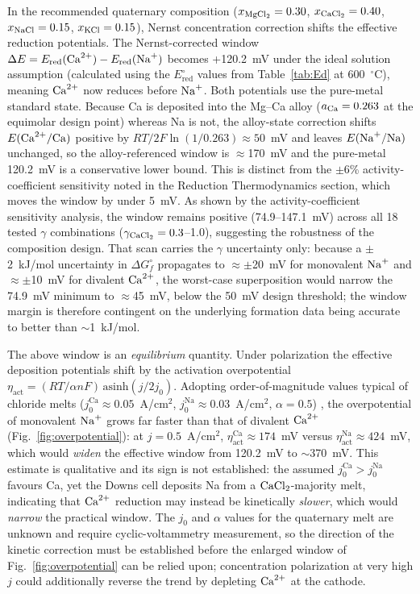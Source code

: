 \documentclass[pdflatex,sn-basic,Numbered]{sn-jnl}
\begin{document}
In the recommended quaternary composition ($x_{\ce{MgCl2}}=0.30$, $x_{\ce{CaCl2}}=0.40$, $x_{\ce{NaCl}}=0.15$, $x_{\ce{KCl}}=0.15$), Nernst concentration correction shifts the effective reduction potentials. The Nernst-corrected window $\Delta E = E_{\mathrm{red}}(\ce{Ca^{2+}}) - E_{\mathrm{red}}(\ce{Na+})$ becomes +120.2~mV under the ideal solution assumption (calculated using the $E^{\circ}_{\mathrm{red}}$ values from Table~\ref{tab:Ed} at 600~$^{\circ}$C), meaning $\ce{Ca^{2+}}$ now reduces before $\ce{Na+}$. Both potentials use the pure-metal standard state. Because Ca is deposited into the Mg--Ca alloy ($a_{\ce{Ca}} = 0.263$ at the equimolar design point) whereas Na is not, the alloy-state correction shifts $E(\ce{Ca^{2+}}/\ce{Ca})$ positive by $RT/2F\ln(1/0.263) \approx 50$~mV and leaves $E(\ce{Na+}/\ce{Na})$ unchanged, so the alloy-referenced window is $\approx$170~mV and the pure-metal 120.2~mV is a conservative lower bound. This is distinct from the $\pm$6\% activity-coefficient sensitivity noted in the Reduction Thermodynamics section, which moves the window by under 5~mV. As shown by the activity-coefficient sensitivity analysis, the window remains positive (74.9--147.1~mV) across all 18 tested $\gamma$ combinations ($\gamma_{\ce{CaCl2}} = 0.3$--1.0), suggesting the robustness of the composition design. That scan carries the $\gamma$ uncertainty only: because a $\pm$2~kJ/mol uncertainty in $\Delta G^{\circ}_f$ propagates to $\approx\pm$20~mV for monovalent $\ce{Na+}$ and $\approx\pm$10~mV for divalent $\ce{Ca^{2+}}$, the worst-case superposition would narrow the 74.9~mV minimum to $\approx$45~mV, below the 50~mV design threshold; the window margin is therefore contingent on the underlying formation data being accurate to better than $\sim$1~kJ/mol.

The above window is an \emph{equilibrium} quantity. Under polarization the effective deposition potentials shift by the activation overpotential $\eta_{\mathrm{act}} = (RT/\alpha nF)\,\mathrm{asinh}(j/2j_0)$. Adopting order-of-magnitude values typical of chloride melts ($j_0^{\mathrm{Ca}}\approx 0.05$~A/cm$^2$, $j_0^{\mathrm{Na}}\approx 0.03$~A/cm$^2$, $\alpha = 0.5$) \cite{pletcher1990}, the overpotential of monovalent $\ce{Na+}$ grows far faster than that of divalent $\ce{Ca^{2+}}$ (Fig.~\ref{fig:overpotential}): at $j = 0.5$~A/cm$^2$, $\eta_{\mathrm{act}}^{\mathrm{Ca}} \approx 174$~mV versus $\eta_{\mathrm{act}}^{\mathrm{Na}} \approx 424$~mV, which would \emph{widen} the effective window from 120.2~mV to $\sim$370~mV. This estimate is qualitative and its sign is not established: the assumed $j_0^{\mathrm{Ca}} > j_0^{\mathrm{Na}}$ favours Ca, yet the Downs cell deposits Na from a $\ce{CaCl2}$-majority melt, indicating that $\ce{Ca^{2+}}$ reduction may instead be kinetically \emph{slower}, which would \emph{narrow} the practical window. The $j_0$ and $\alpha$ values for the quaternary melt are unknown and require cyclic-voltammetry measurement, so the direction of the kinetic correction must be established before the enlarged window of Fig.~\ref{fig:overpotential} can be relied upon; concentration polarization at very high $j$ could additionally reverse the trend by depleting $\ce{Ca^{2+}}$ at the cathode.
\end{document}

